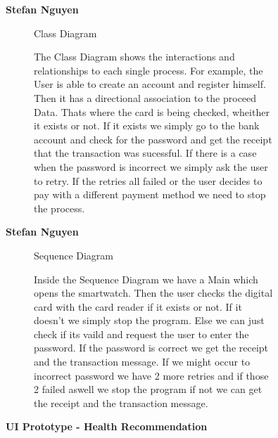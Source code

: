 \documentclass{article}
\begin{document}
	\begin{figure}[htbp]
		\textbf{Stefan Nguyen}
		\centering
		\begin{subfigure}{\textwidth}
			\resizebox{\textwidth}{!}{}
			\caption{Class Diagram}
		\end{subfigure}
		\begin{subfigure}{\textwidth}
			The Class Diagram shows the interactions and relationships to each single process. For example, the User is
			able to create an account and register himself. Then it has a directional association to the proceed Data. Thats
			where the card is being checked, wheither it exists or not. If it exists we simply go to the bank account and check 
			for the password and get the receipt that the transaction was sucessful. If there is a case when the password is 
			incorrect we simply ask the user to retry. If the retries all failed or the user decides to pay with a different 
			payment method we need to stop the process. 
		\end{subfigure}
	\end{figure}
	\clearpage
	\begin{figure}[htbp]
		\textbf{Stefan Nguyen}
		\centering
		\begin{subfigure}{\textwidth}
			\resizebox{\textwidth}{!}{}
			\caption{Sequence Diagram}
		\end{subfigure}
		\begin{subfigure}{\textwidth}
			Inside the Sequence Diagram we have a Main which opens the smartwatch. Then the user checks the digital card with the 
			card reader if it exists or not. If it doesn't we simply stop the program. Else we can just check if its vaild and request the 
			user to enter the password. If the password is correct we get the receipt and the transaction message. If we might occur to incorrect 
			password we have 2 more retries and if those 2 failed aswell we stop the program if not we can get the receipt and the transaction
			message. 
		\end{subfigure}
	\end{figure}
	\clearpage
	\begin{figure}[htbp]
		\textbf{UI Prototype - Health Recommendation}
		\centering
		\begin{subfigure}{\textwidth}
			\resizebox{\textwidth}{!}{}
		\end{subfigure}
		\begin{subfigure}{\textwidth}
		
		\end{subfigure}
	\end{figure}
	\clearpage
\end{document}
